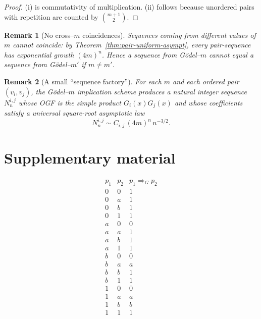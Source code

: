 \documentclass[11pt]{article}
\newtheorem{remark}{Remark}
\begin{document}
\begin{proof}
(i) is commutativity of multiplication. (ii) follows because unordered pairs with repetition are counted by
$\binom{m+1}{2}$.
\end{proof}

\begin{remark}[No cross--$m$ coincidences]\label{rem:no-cross-m}
Sequences coming from different values of $m$ cannot coincide: by Theorem~\ref{thm:pair-uniform-asympt},
every pair-sequence has exponential growth $(4m)^n$. Hence a sequence from Gödel--$m$ cannot equal a sequence
from Gödel--$m'$ if $m\neq m'$.
\end{remark}

\begin{remark}[A small ``sequence factory'']\label{rem:sequence-factory}
For each $m$ and each ordered pair $(v_i,v_j)$, the Gödel--$m$ implication scheme produces a natural
integer sequence $N_n^{i,j}$ whose OGF is the simple product $G_i(x)G_j(x)$ and whose coefficients satisfy
a universal square-root asymptotic law
\[
N^{i,j}_n \sim C_{i,j}\,(4m)^n\,n^{-3/2}.
\]
\end{remark}





\newpage
\appendix

\section{Supplementary material}

\begin{table}[h]
\centering
\[
\begin{array}{c|c|c}
p_1 & p_2 & p_1 \Rightarrow_G p_2\\
\hline
0 & 0 & 1\\
0 & a & 1\\
0 & b & 1\\
0 & 1 & 1\\
a & 0 & 0\\
a & a & 1\\
a & b & 1\\
a & 1 & 1\\
b & 0 & 0\\
b & a & a\\
b & b & 1\\
b & 1 & 1\\
1 & 0 & 0\\
1 & a & a\\
1 & b & b\\
1 & 1 & 1
\end{array}
\]
\caption{Explicit truth table for \(p_1 \Rightarrow_G p_2\) on \(V_4\).}
\label{tab:godel-n2}
\end{table}
\end{document}
